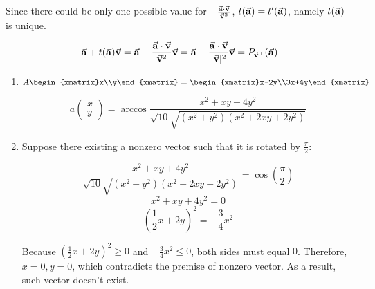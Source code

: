 \begin{exercise}{24}
\begin{enumerate}
         Since there could be only one possible value for $-\frac{\vec{\mathbf{a}} \cdot \vec{\mathbf{v}}}{\vec{\mathbf{v}}^2}$, $t(\vec{\mathbf{a}}) = t'(\vec{\mathbf{a}})$, namely $t(\vec{\mathbf{a}})$ is unique.
         
        $$\vec{\mathbf{a}} + t(\vec{\mathbf{a}})\vec{\mathbf{v}} = \vec{\mathbf{a}} -\frac{\vec{\mathbf{a}} \cdot \vec{\mathbf{v}}}{\vec{\mathbf{v}}^2}\vec{\mathbf{v}} = \vec{\mathbf{a}} - \frac{\vec{\mathbf{a}} \cdot \vec{\mathbf{v}}}{|\vec{\mathbf{v}}|^2}\vec{\mathbf{v}} = P_{\vec{\mathbf{v}}^{\bot}}(\vec{\mathbf{a}})$$
        
        \rQED
  \end{enumerate}
\end{exercise}

\begin{exercise}{26}
  \begin{enumerate}
    \item $$A\begin{xmatrix}x\\y\end{xmatrix} = \begin{xmatrix}x-2y\\3x+4y\end{xmatrix}$$
    
          $$a\begin{pmatrix}x\\y\end{pmatrix} = \arccos{\frac{x^2+xy+4y^2} {\sqrt{10}\sqrt{(x^2+y^2) (x^2+2xy+2y^2)}}}$$
          
    \item Suppose there existing a nonzero vector such that it is rotated by $\frac{\pi}{2}$:
    
          $$\frac{x^2+xy+4y^2} {\sqrt{10}\sqrt{(x^2+y^2) (x^2+2xy+2y^2)}} = \cos(\frac{\pi}{2})$$
          $$x^2+xy+4y^2=0$$
          $$(\frac{1}{2}x+2y)^2=-\frac{3}{4}x^2$$
          
          Because $(\frac{1}{2}x+2y)^2 \geq 0$ and $-\frac{3}{4}x^2 \leq 0$, both sides must equal $0$. Therefore, $x = 0, y = 0$, which contradicts the premise of nonzero vector. As a result, such vector doesn't exist.
  \end{enumerate}
\end{exercise}















